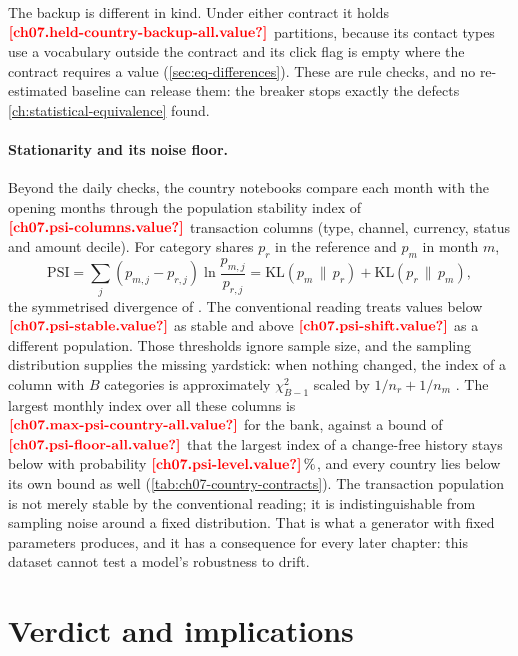 The backup is different in kind. Under either contract it holds $\est{ch07.held-country-backup-all}{value}$ partitions,
because its contact types use a vocabulary outside the contract and its click flag is empty where the contract requires
a value (\cref{sec:eq-differences}). These are rule checks, and no re-estimated baseline can release them: the breaker
stops exactly the defects \cref{ch:statistical-equivalence} found.

\paragraph{Stationarity and its noise floor.} Beyond the daily checks, the country notebooks compare each month with the
opening months through the population stability index of $\est{ch07.psi-columns}{value}$ transaction columns (type, channel, currency, status
and amount decile). For category shares $p_r$ in the reference and $p_m$ in month $m$,
\begin{equation}\label{eq:sf-psi}
  \mathrm{PSI} = \sum_{j} (p_{m,j} - p_{r,j}) \ln \frac{p_{m,j}}{p_{r,j}}
  = \mathrm{KL}(p_m \,\|\, p_r) + \mathrm{KL}(p_r \,\|\, p_m),
\end{equation}
the symmetrised divergence of \textcite{jeffreys1946}. The conventional reading treats values below
$\est{ch07.psi-stable}{value}$ as stable and above $\est{ch07.psi-shift}{value}$ as a different population. Those
thresholds ignore sample size, and the sampling distribution supplies the missing yardstick: when nothing changed, the
index of a column with $B$ categories is approximately $\chi^2_{B-1}$ scaled by $1/n_r + 1/n_m$
\autocite{yurdakul2018}. The largest monthly index over all these columns is $\est{ch07.max-psi-country-all}{value}$ for
the bank, against a bound of $\est{ch07.psi-floor-all}{value}$ that the largest index of a change-free history stays
below with probability $\est{ch07.psi-level}{value}\,\%$, and every country lies below its own bound as well
(\cref{tab:ch07-country-contracts}). The transaction population is not merely stable by the conventional reading; it is
indistinguishable from sampling noise around a fixed distribution. That is what a generator with fixed parameters
produces, and it has a consequence for every later chapter: this dataset cannot test a model's robustness to drift.



\section{Verdict and implications}\label{sec:sf-verdict}

